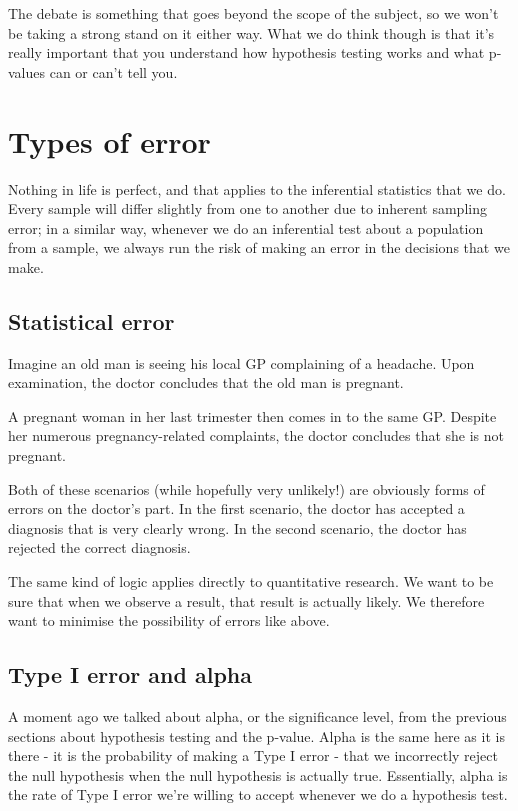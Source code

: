 \documentclass[
]{book}
\begin{document}
The debate is something that goes beyond the scope of the subject, so we won't be taking a strong stand on it either way. What we do think though is that it's really important that you understand how hypothesis testing works and what p-values can or can't tell you.

\hypertarget{types-of-error}{%
\section{Types of error}\label{types-of-error}}

Nothing in life is perfect, and that applies to the inferential statistics that we do. Every sample will differ slightly from one to another due to inherent sampling error; in a similar way, whenever we do an inferential test about a population from a sample, we always run the risk of making an error in the decisions that we make.

\hypertarget{statistical-error}{%
\subsection{Statistical error}\label{statistical-error}}

Imagine an old man is seeing his local GP complaining of a headache. Upon examination, the doctor concludes that the old man is pregnant.

A pregnant woman in her last trimester then comes in to the same GP. Despite her numerous pregnancy-related complaints, the doctor concludes that she is not pregnant.

Both of these scenarios (while hopefully very unlikely!) are obviously forms of errors on the doctor's part. In the first scenario, the doctor has accepted a diagnosis that is very clearly wrong. In the second scenario, the doctor has rejected the correct diagnosis.

The same kind of logic applies directly to quantitative research. We want to be sure that when we observe a result, that result is actually likely. We therefore want to minimise the possibility of errors like above.

\hypertarget{type-i-error-and-alpha}{%
\subsection{Type I error and alpha}\label{type-i-error-and-alpha}}

A moment ago we talked about alpha, or the significance level, from the previous sections about hypothesis testing and the p-value. Alpha is the same here as it is there - it is the probability of making a Type I error - that we incorrectly reject the null hypothesis when the null hypothesis is actually true. Essentially, alpha is the rate of Type I error we're willing to accept whenever we do a hypothesis test.
\end{document}
